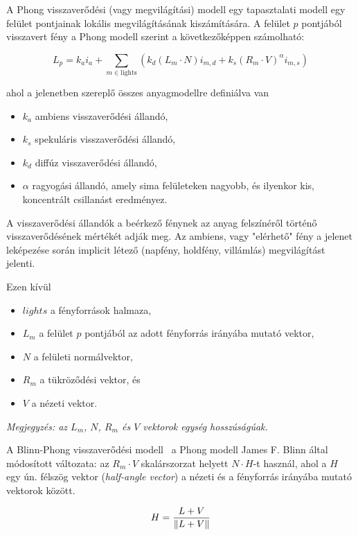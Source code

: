 A Phong visszaverődési (vagy megvilágítási) modell egy tapasztalati modell egy felület pontjainak lokális megvilágításának kiszámítására. A felület \(p\) pontjából visszavert fény a Phong modell szerint a következőképpen számolható:

\[
L_{p} = k_a i_a + \sum_{m \in \textrm{lights}} {\left( k_d (L_m \cdot N) i_{m,d} + k_s(R_m \cdot V)^\alpha i_{m,s} \right)}
\]

ahol a jelenetben szereplő összes anyagmodellre definiálva van

\begin{itemize}[noitemsep]
\item \(k_a\) ambiens visszaverődési állandó,
\item \(k_s\) spekuláris visszaverődési állandó,
\item \(k_d\) diffúz visszaverődési állandó,
\item \(\alpha\) ragyogási állandó, amely sima felületeken nagyobb, és ilyenkor kis, koncentrált csillanást eredményez.
\end{itemize}

A visszaverődési állandók a beérkező fénynek az anyag felszínéről történő visszaverődésének mértékét adják meg. Az ambiens, vagy "elérhető" fény a jelenet leképezése során implicit létező (napfény, holdfény, villámlás) megvilágítást jelenti.

Ezen kívül

\begin{itemize}[noitemsep]
\item \(lights\) a fényforrások halmaza,
\item \(L_m\) a felület \(p\) pontjából az adott fényforrás irányába mutató vektor,
\item \(N\) a felületi normálvektor,
\item \(R_m\) a tükröződési vektor, és
\item \(V\) a nézeti vektor.
\end{itemize}

\textit{Megjegyzés: az \(L_m\), \(N\), \(R_m\) és \(V\) vektorok egység hosszúságúak.}

A Blinn-Phong visszaverődési modell~\cite{blinn1977models} a Phong modell James F. Blinn által módosított változata: az \(R_m \cdot V\) skalárszorzat helyett \(N \cdot H\)-t használ, ahol a \(H\) egy ún. félszög vektor (\textit{half-angle vector}) a nézeti és a fényforrás irányába mutató vektorok között.

\[
H = {{ L + V } \over { \| L + V \| }}
\]

